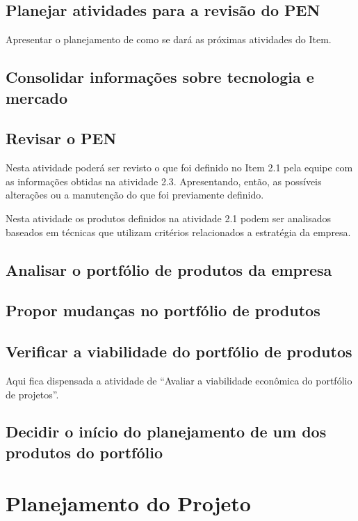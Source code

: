 \documentclass[
	12pt,				%
	openright,			%
	oneside,			%
	a4paper,			%
	english,			%
	french,				%
	spanish,			%
	brazil				%
	]{abntex2}
\begin{document}
\section{Planejar atividades para a revisão do PEN}

Apresentar o planejamento de como se dará as próximas atividades do Item.

\section{Consolidar informações sobre tecnologia e mercado}




\section{Revisar o PEN}


Nesta atividade poderá ser revisto o que foi definido no Item 2.1 pela equipe
com as informações obtidas na atividade 2.3. Apresentando, então, as
possíveis alterações ou a manutenção do que foi previamente definido.

Nesta atividade os produtos definidos na atividade 2.1 podem ser analisados
baseados em técnicas que utilizam critérios relacionados a estratégia da
empresa.

\section{Analisar o portfólio de produtos da empresa}

\section{Propor mudanças no portfólio de produtos}

\section{Verificar a viabilidade do portfólio de produtos}

Aqui fica dispensada a atividade de “Avaliar a viabilidade econômica do
portfólio de projetos”.

\section{Decidir o início do planejamento de um dos produtos do portfólio}

\newpage
\chapter{Planejamento do Projeto}
\end{document}
